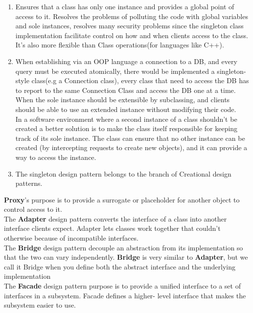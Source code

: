 \begin{parlist}
			\begin{enumerate}
				\item Ensures that a class has only one instance and provides a global point of access to it. Resolves the problems of polluting the code with global variables and sole instances, resolves many security problems since the singleton class implementation facilitate control on how and when clients access to the class. It's also more flexible than Class operations(for languages like C++). \cite{gamma1995elements}
				\item When establishing via an OOP language a connection to a DB, and every query must be executed atomically, there would be implemented a singleton-style class(e.g a Connection class), every class that need to access the DB has to report to the same Connection Class and access the DB one at a time. \\ When the sole instance should be extensible by subclassing, and clients should be able to use an extended instance without modifying their code. \\ In a software environment where a second instance of a class shouldn't be created a better solution is to make the class itself responsible for keeping track of its sole instance. The class can ensure that no other instance can be created (by intercepting requests to create new objects), and it can provide a way to access the instance. \cite{gamma1995elements}
				\item The singleton design pattern belongs to the branch of Creational design patterns.
			\end{enumerate}
		\item \textbf{Proxy}'s purpose is to provide a surrogate or placeholder for another object to control access to it.\\ The \textbf{Adapter} design pattern converts the interface of a class into another interface clients expect. Adapter lets classes work together that couldn't otherwise because of incompatible interfaces. \\ The \textbf{Bridge} design pattern decouple an abstraction from its implementation so that the two can vary independently. \textbf{Bridge} is very similar to \textbf{Adapter}, but we call it Bridge when you define both the abstract interface and the underlying implementation \\ The \textbf{Facade} design pattern purpose is to provide a unified interface to a set of interfaces in a subsystem. Facade defines a higher- level interface that makes the subsystem easier to use.\cite{stackoverflowProxyDecorator}\cite{gamma1995elements}
\end{parlist}